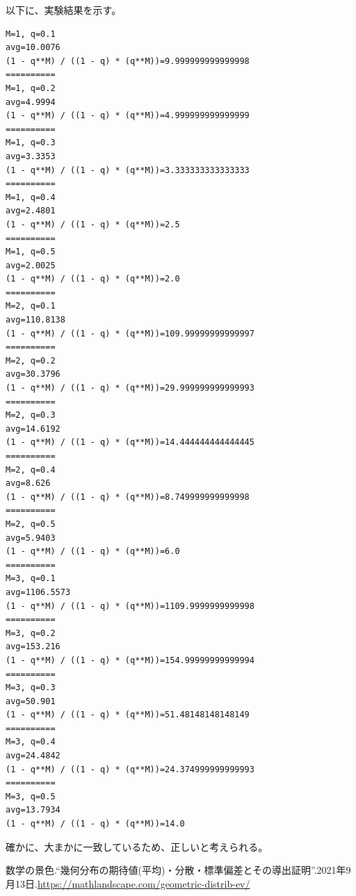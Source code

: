\documentclass[a4paper, 10pt, dvipdfmx]{jlreq}
\begin{document}


以下に、実験結果を示す。

\begin{lstlisting}[caption=実験結果, label=code:実験結果]
M=1, q=0.1
avg=10.0076
(1 - q**M) / ((1 - q) * (q**M))=9.999999999999998
==========
M=1, q=0.2
avg=4.9994
(1 - q**M) / ((1 - q) * (q**M))=4.999999999999999
==========
M=1, q=0.3
avg=3.3353
(1 - q**M) / ((1 - q) * (q**M))=3.333333333333333
==========
M=1, q=0.4
avg=2.4801
(1 - q**M) / ((1 - q) * (q**M))=2.5
==========
M=1, q=0.5
avg=2.0025
(1 - q**M) / ((1 - q) * (q**M))=2.0
==========
M=2, q=0.1
avg=110.8138
(1 - q**M) / ((1 - q) * (q**M))=109.99999999999997
==========
M=2, q=0.2
avg=30.3796
(1 - q**M) / ((1 - q) * (q**M))=29.999999999999993
==========
M=2, q=0.3
avg=14.6192
(1 - q**M) / ((1 - q) * (q**M))=14.444444444444445
==========
M=2, q=0.4
avg=8.626
(1 - q**M) / ((1 - q) * (q**M))=8.749999999999998
==========
M=2, q=0.5
avg=5.9403
(1 - q**M) / ((1 - q) * (q**M))=6.0
==========
M=3, q=0.1
avg=1106.5573
(1 - q**M) / ((1 - q) * (q**M))=1109.9999999999998
==========
M=3, q=0.2
avg=153.216
(1 - q**M) / ((1 - q) * (q**M))=154.99999999999994
==========
M=3, q=0.3
avg=50.901
(1 - q**M) / ((1 - q) * (q**M))=51.48148148148149
==========
M=3, q=0.4
avg=24.4842
(1 - q**M) / ((1 - q) * (q**M))=24.374999999999993
==========
M=3, q=0.5
avg=13.7934
(1 - q**M) / ((1 - q) * (q**M))=14.0
\end{lstlisting}

確かに、大まかに一致しているため、正しいと考えられる。

\begin{thebibliography}{9}
    数学の景色.“幾何分布の期待値(平均)・分散・標準偏差とその導出証明”.2021年9月13日.\url{https://mathlandscape.com/geometric-distrib-ev/}
\end{thebibliography}
\end{document}
